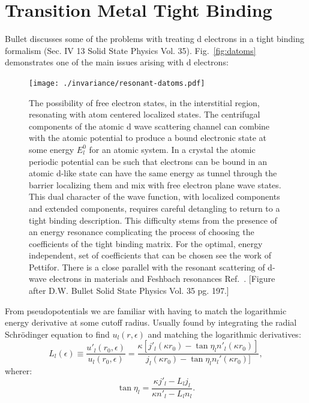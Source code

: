 \section{Transition Metal Tight Binding}
\label{sec:tmtb}
Bullet discusses some of the problems with treating d electrons in a tight binding 
formalism (Sec. IV 13 Solid State Physics Vol. 35). Fig.~\ref{fig:datoms} demonstrates
one of the main issues arising with d electrons:
%
\begin{figure}
\texttt{[image: ./invariance/resonant-datoms.pdf]}
\caption{The possibility of free electron states, in the interstitial region, 
resonating with atom centered localized states. The centrifugal components of the 
atomic d wave scattering channel can combine with
the atomic potential to produce a bound electronic state at some energy $E^{0}_{l}$ for an atomic system.
In a crystal the atomic periodic potential can be such that electrons can be bound in an
atomic d-like state can have the same energy as tunnel through the barrier localizing 
them and mix with free electron plane wave states. This dual character of the wave 
function, with localized components and extended components, requires careful 
detangling to return to a tight binding description. This difficulty 
stems from the presence of an energy resonance 
complicating the process of choosing the coefficients of the tight binding matrix. 
For the optimal, energy independent, set of coefficients that can be 
chosen see the work of Pettifor. There is a close parallel with the resonant
scattering of d-wave electrons in materials and Feshbach resonances Ref.~\cite{chin10}.
[Figure after D.W. Bullet Solid State Physics Vol. 35 pg. 197.]}
\end{figure}
%

From pseudopotentials we are familiar with having to match the logarithmic energy
derivative at some cutoff radius. Usually found by integrating the radial
Schr\"odinger equation to find $u_{l}(r,\epsilon)$ and matching the logarithmic derivatives:
%
\begin{equation}
L_{l}(\epsilon) \equiv \frac{u'_{l}(r_{0},\epsilon)}{u_{l}(r_{0},\epsilon)} = \frac{\kappa[j'_{l}
(\kappa r_{0}) - \tan \eta_{l} n'_{l}(\kappa r_{0})]} {j_{l}(\kappa r_{0}) - \tan \eta_{l} n_{l}'(\kappa r_{0})]},
\end{equation}
%
wherer:
%
\begin{equation}
\label{eq:phaseshift}
\tan \eta_{l} = \frac{\kappa j'_{l} - L_{l}j_{l}}{\kappa n'_{l} - L_{l}n_{l}}.
\end{equation}

